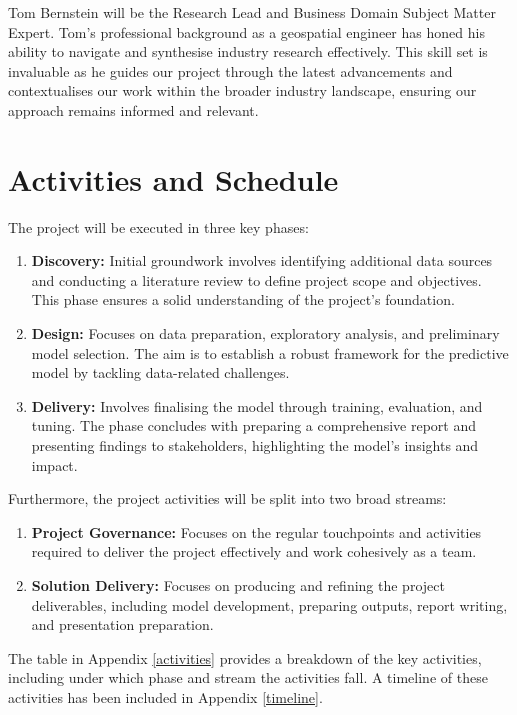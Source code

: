 \documentclass[mstat,12pt]{unswthesis}
\begin{document}
Tom Bernstein will be the Research Lead and Business Domain Subject Matter Expert. Tom's professional background as a geospatial engineer has honed his ability to navigate and synthesise industry research effectively. This skill set is invaluable as he guides our project through the latest advancements and contextualises our work within the broader industry landscape, ensuring our approach remains informed and relevant. \newline

\hypertarget{activities-and-schedule}{
    \section{Activities and Schedule}
    \label{activities-and-schedule}
}

The project will be executed in three key phases:
\begin{enumerate}
    \item \textbf{Discovery:} Initial groundwork involves identifying additional data sources and conducting a literature review to define project scope and objectives. This phase ensures a solid understanding of the project's foundation.
    \item \textbf{Design:} Focuses on data preparation, exploratory analysis, and preliminary model selection. The aim is to establish a robust framework for the predictive model by tackling data-related challenges.
    \item \textbf{Delivery:} Involves finalising the model through training, evaluation, and tuning. The phase concludes with preparing a comprehensive report and presenting findings to stakeholders, highlighting the model's insights and impact.\newline
\end{enumerate}
Furthermore, the project activities will be split into two broad streams:
\begin{enumerate}
    \item \textbf{Project Governance:} Focuses on the regular touchpoints and activities required to deliver the project effectively and work cohesively as a team.
    \item \textbf{Solution Delivery:} Focuses on producing and refining the project deliverables, including model development, preparing outputs, report writing, and presentation preparation.\newline

\end{enumerate}
The table in Appendix \ref{activities} provides a breakdown of the key activities, including under which phase and stream the activities fall. A timeline of these activities has been included in Appendix \ref{timeline}. \newpage
\end{document}
